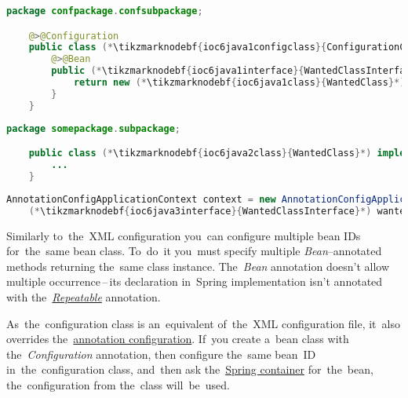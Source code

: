 \begin{lstlisting}[language=Java, title={Configuration class}]
    package confpackage.confsubpackage;

    @>@Configuration
    public class (*\tikzmarknodebf{ioc6java1configclass}{ConfigurationClass}*) {
        @>@Bean
        public (*\tikzmarknodebf{ioc6java1interface}{WantedClassInterface}*) (*\tikzmarknodebf{ioc6java1beanid}{wantedBeanMethod}*)() {
            return new (*\tikzmarknodebf{ioc6java1class}{WantedClass}*)();
        }
    }
\end{lstlisting}
\begin{lstlisting}[language=Java, title={Wanted class}]
    package somepackage.subpackage;

    public class (*\tikzmarknodebf{ioc6java2class}{WantedClass}*) implements (*\tikzmarknodebf{ioc6java2interface}{WantedClassInterface}*) {
        ...
    }
\end{lstlisting}
\begin{lstlisting}[language=Java, title={Usage}]
    AnnotationConfigApplicationContext context = new AnnotationConfigApplicationContext((*\tikzmarknodebf{ioc6java3configclass}{ConfigurationClass}*).class);
    (*\tikzmarknodebf{ioc6java3interface}{WantedClassInterface}*) wantedClassInstance = context.getBean("(*\tikzmarknodebf{ioc6java3beanid}{wantedBeanMethod}[ForestGreen]*)", (*\tikzmarknodebf{ioc6java3interface2}{WantedClassInterface}*).class);
\end{lstlisting}

\noindent Similarly to~the~XML configuration you~can configure multiple bean IDs for~the~same bean class. To~do~it you~must specify multiple \textit{Bean}--annotated methods returning the~same class instance. The~\textit{Bean} annotation doesn't allow multiple occurrence\,--\,its declaration in~Spring implementation isn't annotated with the~\hyperref[annotationsrepeatable]{\textit{Repeatable}} annotation.

\warning As~the~configuration class is an~equivalent of~the~XML configuration file, it~also overrides the~\hyperref[iocannotations]{annotation configuration}. If~you create a~bean class with the~\textit{Configuration} annotation, then configure the~same bean~ID in~the~configuration class, and~then ask the~\hyperref[springcontainrer]{Spring container} for~the~bean, the~configuration from the~class will~be~used.
\newpage
